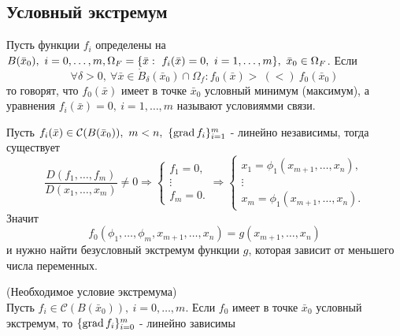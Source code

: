 \subsection{Условный экстремум}
\begin{definition}
Пусть функции $f_i$ определены на $B(\bar{x}_0),\ i=0,\dots, m,\\
\Omega_F=\{\bar{x}:\ f_i(\bar{x})=0,\ i=1,\dots,m\},\ \bar{x}_0\in \Omega_F$. Если
\[\forall \delta>0,\ \forall \bar{x}\in \mathring{B}_{\delta}(\bar{x}_0)\cap \Omega_f: f_0(\bar{x}) >\ (<)\ f_0(\bar{x}_0)\]
то говорят, что $f_0(\bar{x})$ имеет в точке $\bar{x}_0$ условный минимум (максимум), а уравнения $f_i(\bar{x})=0,\ i=1,\dots,m$ называют условиямми связи.
\end{definition} 
\begin{comm}
    Пусть $f_i(\bar{x})\in \mathcal{C}(B(\bar{x}_0)),\ m<n,\ \{\operatorname*{grad} f_i\}_{i=1}^m$ - линейно независимы, тогда существует
    \[\frac{D(f_1,\dots, f_m)}{D(x_1,\dots,x_m)}\ne 0 \Rightarrow \begin{cases}
        f_1=0,\\
        \vdots\\
        f_m=0.
    \end{cases}
    \Rightarrow \begin{cases} %
        x_1=\phi_1(x_{m+1},\dots,x_n),\\
        \vdots\\
        x_m=\phi_1(x_{m+1},\dots,x_n).
    \end{cases}
    \]
    Значит
    \[f_0(\phi_1,\dots,\phi_m,x_{m+1},\dots,x_n)=g(x_{m+1},\dots,x_n)\]
    и нужно найти безусловный экстремум функции $g$, которая зависит от меньшего числа переменных. 
\end{comm} 
\begin{theorem} (Необходимое условие экстремума)\\ %
    Пусть $f_i\in \mathcal{C}(B(\bar{x}_0)),\ i=0,\dots,m$. Если $f_0$ имеет в точке $\bar{x}_0$ условный экстремум, то $\{\operatorname*{grad} f_i\}_{i=0}^m$ - линейно зависимы
\end{theorem} 
